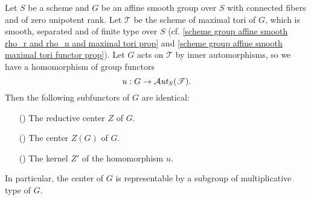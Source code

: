 \begin{proposition}\label{scheme smooth affine zero unipotent rank reductive center is center}
Let $S$ be a scheme and $G$ be an affine smooth group over $S$ with connected fibers and of zero unipotent rank. Let $\mathscr{T}$ be the scheme of maximal tori of $G$, which is smooth, separated and of finite type over $S$ (cf. \cref{scheme group affine smooth rho_r and rho_n and maximal tori prop} and \cref{scheme group affine smooth maximal tori functor prop}). Let $G$ acts on $\mathscr{T}$ by inner automorphisms, so we have a homomorphism of group functors
\[u:G\to\operatorname{\mathcal{A}\hspace*{-0.2pt}\textit{ut}\hspace{0.5pt}}_S(\mathscr{T}).\]
Then the following subfunctors of $G$ are identical:
\begin{enumerate}
    \item[(\rmnum{1})] The reductive center $Z$ of $G$.
    \item[(\rmnum{2})] The center $Z(G)$ of $G$.
    \item[(\rmnum{3})] The kernel $Z'$ of the homomorphism $u$.
\end{enumerate}
In particular, the center of $G$ is representable by a subgroup of multiplicative type of $G$.
\end{proposition}
